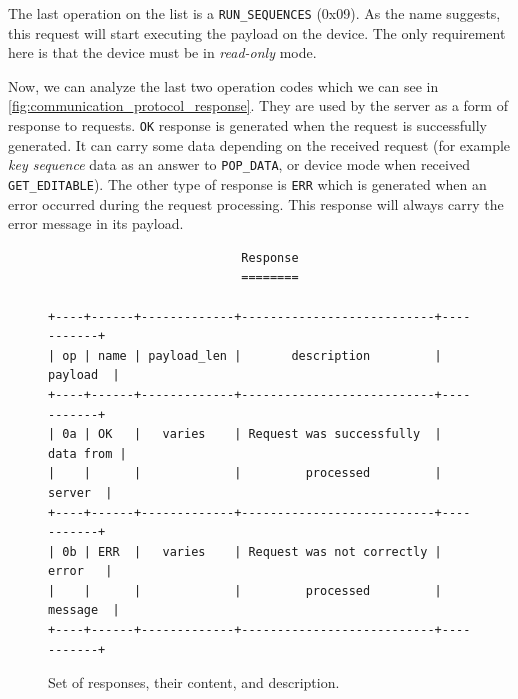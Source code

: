 The last operation on the list is a \verb|RUN_SEQUENCES| (0x09). As the name suggests, this request will start executing the payload on the device. The only requirement here is that the device must be in \emph{read-only} mode.

Now, we can analyze the last two operation codes which we can see in \autoref{fig:communication_protocol_response}. They are used by the server as a form of response to requests. \verb|OK| response is generated when the request is successfully generated. It can carry some data depending on the received request (for example \emph{key sequence} data as an answer to \verb|POP_DATA|, or device mode when received \verb|GET_EDITABLE|). The other type of response is \verb|ERR| which is generated when an error occurred during the request processing. This response will always carry the error message in its payload.

\begin{figure}[ht]
\centering
\begin{varwidth}{\linewidth}
\begin{verbatim}
                           Response
                           ========

+----+------+-------------+---------------------------+-----------+
| op | name | payload_len |       description         |  payload  |
+----+------+-------------+---------------------------+-----------+
| 0a | OK   |   varies    | Request was successfully  | data from |
|    |      |             |         processed         |   server  |
+----+------+-------------+---------------------------+-----------+
| 0b | ERR  |   varies    | Request was not correctly |   error   |
|    |      |             |         processed         |  message  |
+----+------+-------------+---------------------------+-----------+
\end{verbatim}
\end{varwidth}
\caption{Set of responses, their content, and description.}
\label{fig:communication_protocol_response}
\end{figure}

